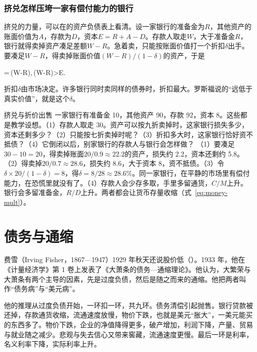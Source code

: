 \subsubsection{挤兑怎样压垮一家有偿付能力的银行}

挤兑的力量，可以在的资产负债表上看清。设一家银行的准备金为$R$，其他资产的账面价值为$A$，存款为$D$，资本$E=R+A-D$。存款人取走$W$，大于准备金$R$，银行就得卖掉资产凑足差额$W-R$。急着卖，只能按账面价值打一个折扣$\delta$出手。要凑足$W-R$，得卖掉账面价值$(W-R)/(1-\delta)$的资产，于是
\begin{keyeq}
=\,(W-R),\qquad {}\iff {}\,(W-R)>E.\label{eq:depressionus-firesale}
\end{keyeq}
折扣$\delta$由市场决定。许多银行同时卖同样的债券时，折扣最大。罗斯福说的“远低于真实价值”，就是这个$\delta$\cite{fdr1933}。

\begin{example}{挤兑与折价出售}\label{ex:depressionus-run}
一家银行有准备金 10，其他资产 90，存款 92，资本 8。这些都是教学设想。（1）存款人取走 30。资产可以按九折卖掉时，这家银行损失多少，资本还剩多少？（2）只能按七折卖掉时呢？（3）折扣多大时，这家银行恰好资不抵债？（4）它倒闭以后，别家银行的存款人与银行会怎样做？
\solution （1）要凑足$30-10=20$，得卖掉账面$20/0.9\approx22.2$的资产，损失约 2.2，资本还剩约 5.8。（2）得卖掉$20/0.7\approx28.6$，损失约 8.6，大于资本 8，资不抵债。（3）令$\delta\times20/(1-\delta)=8$，得$\delta=8/28\approx28.6\%$。同一家银行，在平静的市场里有偿付能力，在恐慌里就没有了。（4）存款人会少存多取，手里多留通货，$C/M$上升。银行会多留准备金，$R/D$上升。两者都会让货币存量收缩（式~\eqref{eq:money-mult}）。
\end{example}

\section{债务与通缩}\label{sec:depressionus-fisher}

费雪（Irving Fisher，1867—1947）1929 年秋天还说股价低（）。1933 年，他在《计量经济学》第 1 卷上发表了《大萧条的债务—通缩理论》\cite{fisher1933}。他认为，大繁荣与大萧条有两个主导的因素，先是过度负债，然后是随之而来的通缩\cite{fisher1933}。他把两者叫作“债务病”与“美元病”\cite{fisher1933}。

他的推理从过度负债开始，一环扣一环，共九环。债务清偿引起抛售。银行贷款被还掉，存款通货收缩，流通速度放慢，物价下跌，也就是美元“胀大”，一美元能买的东西多了\cite{fisher1933}。物价下跌，企业的净值降得更多，破产增加，利润下降，产量、贸易与就业随之减少。悲观与失去信心又带来窖藏，流通速度更慢\cite{fisher1933}。最后一环是利率，名义利率下降，实际利率上升\cite{fisher1933}。

